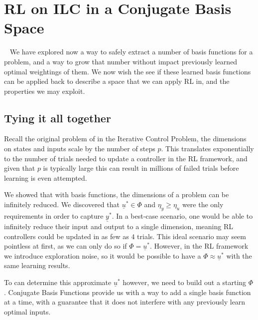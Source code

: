 
\FloatBarrier\section{RL on ILC in a Conjugate Basis Space}
~\label{sec:rl_on_conjugate_basis_ilc}
We have explored now a way to safely extract a number of basis functions for a problem, and a way to grow that number without impact previously learned optimal weightings of them. We now wish the see if these learned basis functions can be applied back to describe a space that we can apply RL in, and the properties we may exploit.

\FloatBarrier\subsection{Tying it all together}
Recall the original problem of in the Iterative Control Problem, the dimensions on states and inputs scale by the number of steps $p$. This translates exponentially to the number of trials needed to update a controller in the \ac{RL} framework, and given that $p$ is typically large this can result in millions of failed trials before learning is even attempted.

We showed that with basis functions, the dimensions of a problem can be infinitely reduced. We discovered that $\underline{u}^\ast \in \Phi$ and $\eta_y \geq \eta_u$ were the only requirements in order to capture $\underline{y}^\ast$. In a best-case scenario, one would be able to infinitely reduce their input and output to a single dimension, meaning RL controllers could be updated in as few as $4$ trials. This ideal scenario may seem pointless at first, as we can only do so if $\Phi = \underline{u}^\ast$. However, in the RL framework we introduce exploration noise, so it would be possible to have a $\Phi \approx \underline{u}^\ast$ with the same learning results.

To can determine this approximate $\underline{u}^\ast$ however, we need to build out a starting $\Phi$. Conjugate Basis Functions provide us with a way to add a single basis function at a time, with a guarantee that it does not interfere with any previously learn optimal inputs. 


